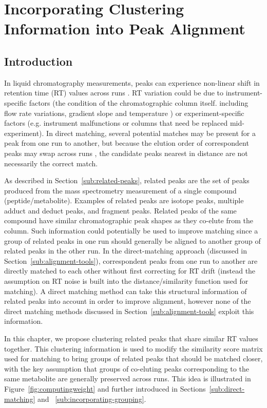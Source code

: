 \chapter{Incorporating Clustering Information into Peak Alignment}
\label{c:matching}

\section{Introduction}

In liquid chromatography measurements, peaks can experience non-linear shift in retention time (RT) values across runs \cite{Podwojski2009}. RT variation could be due to instrument-specific factors (the condition of the chromatographic column itself. including flow rate variations, gradient slope and temperature \cite{Christin2008}) or experiment-specific factors (e.g. instrument malfunctions or columns that need be replaced mid-experiment). In direct matching, several potential matches may be present for a peak from one run to another, but because the elution order of correspondent peaks may swap across runs \cite{Smith2013}, the candidate peaks nearest in distance are not necessarily the correct match.

As described in Section~\ref{sub:related-peaks}, related peaks are the set of peaks produced from the mass spectrometry measurement of a single compound (peptide/metabolite). Examples of related peaks are isotope peaks, multiple adduct and deduct peaks, and fragment peaks. Related peaks of the same compound have similar chromatographic peak shapes as they co-elute from the column. Such information could potentially be used to improve matching since a group of related peaks in one run should generally be aligned to another group of related peaks in the other run. In the direct-matching approach (discussed in Section~\ref{sub:alignment-tools}), correspondent peaks from one run to another are directly matched to each other without first correcting for RT drift (instead the assumption on RT noise is built into the distance/similarity function used for matching). A direct matching method can take this structural information of related peaks into account in order to improve alignment, however none of the direct matching methods discussed in Section~\ref{sub:alignment-tools} exploit this information.

In this chapter, we propose clustering related peaks that share similar RT values together. This clustering information is used to modify the similarity score matrix used for matching to bring groups of related peaks that should be matched closer, with the key assumption that groups of co-eluting peaks corresponding to the same metabolite are generally preserved across runs. This idea is illustrated in Figure~\ref{fig:computingweight} and further introduced in Sections~\ref{sub:direct-matching} and ~\ref{sub:incorporating-grouping}.  

